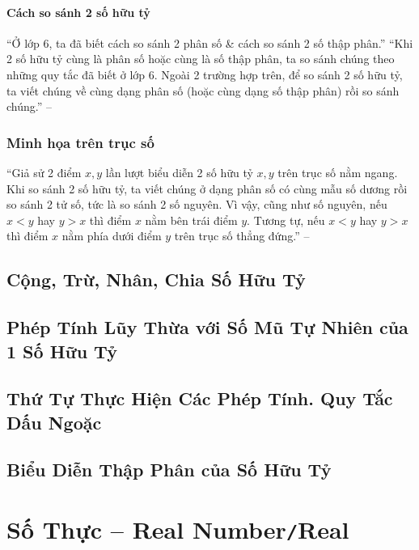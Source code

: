 \documentclass[oneside]{book}
\numberwithin{equation}{section}
\begin{document}
\subsubsection{Cách so sánh 2 số hữu tỷ}
``Ở lớp 6, ta đã biết cách so sánh 2 phân số \& cách so sánh 2 số thập phân.'' ``Khi 2 số hữu tỷ cùng là phân số hoặc cùng là số thập phân, ta so sánh chúng theo những quy tắc đã biết ở lớp 6. Ngoài 2 trường hợp trên, để so sánh 2 số hữu tỷ, ta viết chúng về cùng dạng phân số (hoặc cùng dạng số thập phân) rồi so sánh chúng.'' -- \cite[p. 9]{SGK_Toan_7_Canh_Dieu_tap_1}

\subsection{Minh họa trên trục số}
``Giả sử 2 điểm $x,y$ lần lượt biểu diễn 2 số hữu tỷ $x,y$ trên trục số nằm ngang. Khi so sánh 2 số hữu tỷ, ta viết chúng ở dạng phân số có cùng mẫu số dương rồi so sánh 2 tử số, tức là so sánh 2 số nguyên. Vì vậy, cũng như số nguyên, nếu $x < y$ hay $y > x$ thì điểm $x$ nằm bên trái điểm $y$. Tương tự, nếu $x < y$ hay $y > x$ thì điểm $x$ nằm phía dưới điểm $y$ trên trục số thẳng đứng.'' -- \cite[pp. 9--10]{SGK_Toan_7_Canh_Dieu_tap_1}

\section{Cộng, Trừ, Nhân, Chia Số Hữu Tỷ}

\section{Phép Tính Lũy Thừa với Số Mũ Tự Nhiên của 1 Số Hữu Tỷ}

\section{Thứ Tự Thực Hiện Các Phép Tính. Quy Tắc Dấu Ngoặc}

\section{Biểu Diễn Thập Phân của Số Hữu Tỷ}


\chapter{Số Thực -- Real Number\texttt{/}Real}
\end{document}

